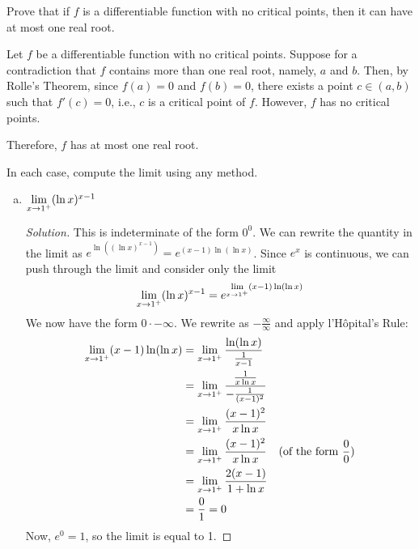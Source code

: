 \documentclass{agony}
\begin{document}
\begin{prob}
  Prove that if $f$ is a differentiable function with no critical points,
  then it can have at most one real root.
\end{prob}
\begin{prf}
  Let $f$ be a differentiable function with no critical points.
  Suppose for a contradiction that $f$ contains more than one real root, namely, $a$ and $b$.
  Then, by Rolle's Theorem, since $f(a) = 0$ and $f(b) = 0$, there exists a point $c\in(a,b)$
  such that $f'(c) = 0$, i.e., $c$ is a critical point of $f$.
  However, $f$ has no critical points.

  Therefore, $f$ has at most one real root.
\end{prf}

\begin{prob}
  In each case, compute the limit using any method.
  \begin{enumerate}[(a)]
    \item $\lim\limits_{x\to1^+}(\ln x)^{x-1}$
          \begin{proof}[Solution]
            This is indeterminate of the form $0^0$.
            We can rewrite the quantity in the limit as $e^{\ln((\ln x)^{x-1})} = e^{(x-1)\ln(\ln x)}$.
            Since $e^x$ is continuous, we can push through the limit and consider only the limit
            \[ \lim\limits_{x\to1^+}(\ln x)^{x-1} = e^{\lim\limits_{x\to1^+}(x-1)\ln(\ln x)} \]
            We now have the form $0\cdot-\infty$.
            We rewrite as $-\frac{\infty}{\infty}$ and apply l'Hôpital's Rule:
            \begin{align*}
              \lim\limits_{x\to1^+}(x-1)\ln(\ln x)
               & = \lim\limits_{x\to1^+}\frac{\ln(\ln x)}{\frac{1}{x-1}}                                             \\
               & = \lim\limits_{x\to1^+}\frac{\frac{1}{x\ln x}}{-\frac{1}{(x-1)^2}}                                  \\
               & = \lim\limits_{x\to1^+}\frac{(x-1)^2}{x \ln x}                                                      \\
               & = \lim\limits_{x\to1^+}\frac{(x-1)^2}{x \ln x}                     & \text{(of the form $\frac00$)} \\
               & = \lim\limits_{x\to1^+}\frac{2(x-1)}{1+\ln x}                                                       \\
               & = \frac{0}{1} = 0
            \end{align*}
            Now, $e^0 = 1$, so the limit is equal to 1.

\end{proof}
\end{enumerate}
\end{prob}
\end{document}
